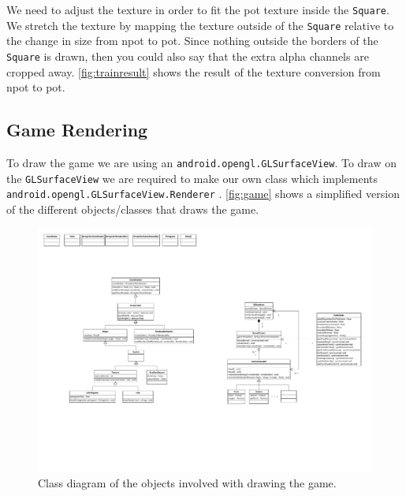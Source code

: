 We need to adjust the texture in order to fit the \ac{pot} texture inside the \lstinline|Square|. We stretch the texture by mapping the texture outside of the \lstinline|Square| relative to the change in size from \ac{npot} to \ac{pot}. Since nothing outside the borders of the \lstinline|Square| is drawn, then you could also say that the extra alpha channels are cropped away. \autoref{fig:trainresult} shows the result of the texture conversion from \ac{npot} to \ac{pot}.

\subsection{Game Rendering}\label{sec:gamerendering}

To draw the game we are using an \lstinline|android.opengl.GLSurfaceView|. To draw on the \linebreak \lstinline|GLSurfaceView| we are required to make our own class which implements \lstinline|android.opengl.GLSurfaceView.Renderer| \citep{androidopengl}. \autoref{fig:game} shows a simplified version of the different objects/classes that draws the game.

\begin{figure}[H]
\centering
\includegraphics[page=3,width=1\linewidth]{img/opengl.pdf}
\caption{Class diagram of the objects involved with drawing the game.}
\label{fig:game}
\end{figure}

